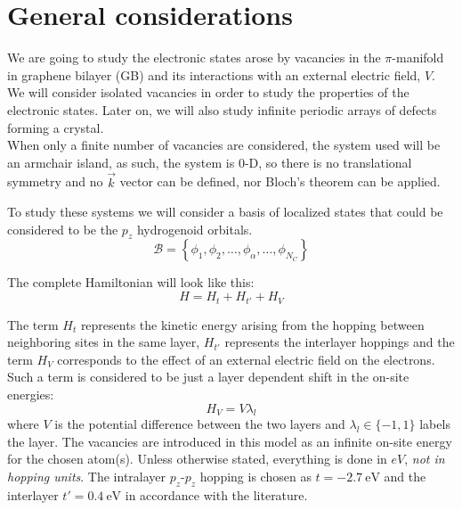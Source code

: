 

\section{General considerations} %
We are going to study the electronic states arose by vacancies in the $\pi$-manifold in graphene bilayer (GB) and its interactions with an external electric field, $V$.
We will consider isolated vacancies in order to study the properties of the electronic states. Later on, we will also study infinite periodic arrays of defects forming a crystal.\\

When only a finite number of vacancies are considered, the system used will be an armchair island, as such, the system is $0$-D, so there is no translational symmetry and no $\vec{k}$ vector can be defined, nor Bloch's theorem can be applied.

To study these systems we will consider a basis of localized states that could be considered to be the $p_z$ hydrogenoid orbitals.
\begin{equation}
  \mathcal{B} = \left\{\phi_1,\phi_2,\dots,\phi_\alpha,\dots,\phi_{N_C}\right\}
\end{equation}

The complete Hamiltonian will look like this:
\begin{equation}
  H = H_t + H_{t'} + H_{V}
\label{hamiltonian}
\end{equation}

The term $H_t$ represents the kinetic energy arising from the hopping between neighboring sites in the same layer, $H_{t'}$ represents the interlayer hoppings and the term $H_{V}$ corresponds to the effect of an external electric field on the electrons. Such a term is considered to be just a layer dependent shift in the on-site energies:
\begin{equation}
  H_{V} = V\lambda_l
\end{equation}
where $V$ is the potential difference between the two layers and $\lambda_l\in\{-1,1\}$ labels the layer.
The vacancies are introduced in this model as an infinite on-site energy for the chosen atom(s). Unless otherwise stated, everything is done in $eV$, \emph{not in hopping units}. The intralayer $p_z$-$p_z$ hopping is chosen as $t=\SI{-2.7}{\eV}$ and the interlayer $t'=\SI{0.4}{\eV}$ in accordance with the literature\cite{KatsnelsonBook}.\\

